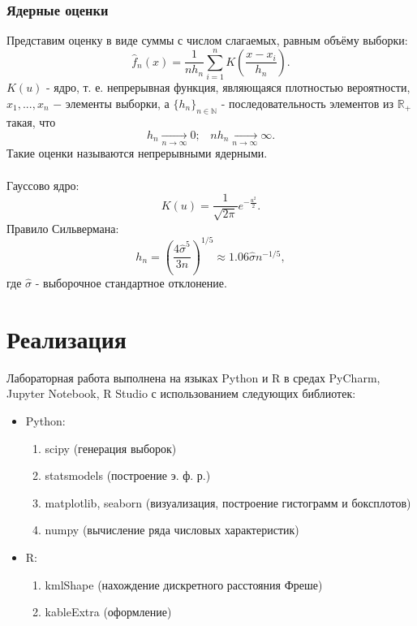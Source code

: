 \documentclass[a4paper]{article}
\begin{document}
\subsubsection{Ядерные оценки}
Представим оценку в виде суммы с числом слагаемых, равным объёму выборки:
\begin{equation}
    \widehat{f}_n(x)=\frac{1}{n h_n}\sum_{i=1}^n K\left(\frac{x-x_i}{h_n}\right).
\end{equation}
$K(u)$ - ядро, т. е. непрерывная функция, являющаяся плотностью вероятности, $x_1,...,x_n$ $-$ элементы выборки, а $\{h_n\}_{n\in\mathbb{N}}$ - последовательность элементов из $\mathbb{R}_+$ такая, что
\begin{equation}
    h_n\xrightarrow[n\to\infty]{}0;\;\;\;n h_n\xrightarrow[n\to\infty]{}\infty.
\end{equation}
Такие оценки называются непрерывными ядерными.\\\\
Гауссово ядро:
\begin{equation}
    K(u)=\frac{1}{\sqrt{2\pi}}e^{-\frac{u^2}{2}}.
\end{equation}
Правило Сильвермана:
\begin{equation}
    h_n=\left(\frac{4\hat{\sigma}^5}{3n}\right)^{1/5}\approx1.06\hat{\sigma}n^{-1/5},
\end{equation}
где $\hat{\sigma}$ - выборочное стандартное отклонение.
\section{Реализация}
Лабораторная работа выполнена на языках Python и R в средах PyCharm, Jupyter Notebook, R Studio с использованием следующих библиотек:
\begin{itemize}
    \item Python:
    \begin{enumerate}
        \item scipy (генерация выборок)
        \item statsmodels (построение э. ф. р.)
        \item matplotlib, seaborn (визуализация, построение гистограмм и боксплотов)
        \item numpy (вычисление ряда числовых характеристик)
    \end{enumerate}
    \item R:
    \begin{enumerate}
        \item kmlShape (нахождение дискретного расстояния Фреше)
        \item kableExtra (оформление)
\end{enumerate}
\end{itemize}
\end{document}
